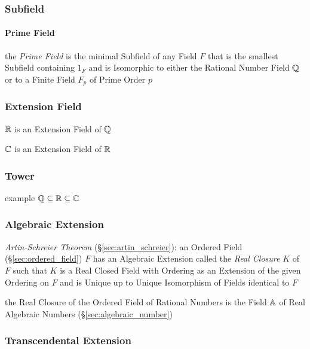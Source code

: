 \subsubsection{Subfield}\label{sec:subfield}

\paragraph{Prime Field}\label{sec:prime_field}\hfill

the \emph{Prime Field} is the minimal Subfield of any Field $F$ that is the
smallest Subfield containing $1_F$ and is Isomorphic to either the Rational
Number Field $\mathbb{Q}$ or to a Finite Field $F_p$ of Prime Order $p$



\subsubsection{Extension Field}\label{sec:extension_field}

$\mathbb{R}$ is an Extension Field of $\mathbb{Q}$

$\mathbb{C}$ is an Extension Field of $\mathbb{R}$



\subsubsection{Tower}\label{sec:tower}

example $\mathbb{Q} \subseteq \mathbb{R} \subseteq \mathbb{C}$



\subsubsection{Algebraic Extension}\label{sec:algebraic_extension}

\emph{Artin-Schreier Theorem} (\S\ref{sec:artin_schreier}): an Ordered Field
(\S\ref{sec:ordered_field}) $F$ has an Algebraic Extension called the
\emph{Real Closure} $K$ of $F$ such that $K$ is a Real Closed Field with
Ordering as an Extension of the given Ordering on $F$ and is Unique up to
Unique Isomorphism of Fields identical to $F$

the Real Closure of the Ordered Field of Rational Numbers is the Field $\mathbb{A}$
of Real Algebraic Numbers (\S\ref{sec:algebraic_number})



\subsubsection{Transcendental Extension}
\label{sec:transcendental_extension}



